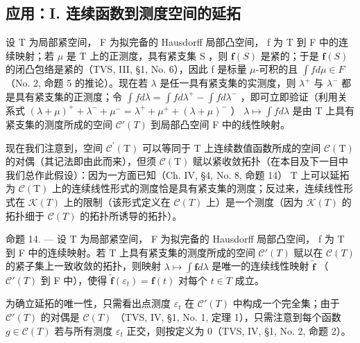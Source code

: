\subsection{应用：I. 连续函数到测度空间的延拓}

设 T 为局部紧空间， F 为拟完备的 Hausdorff 局部凸空间， f 为 T 到 F 中的连续映射；若 \(\mu\) 是 T 上的正测度，具有紧支集 S ，则 \(\mathbf{f}(S)\) 是紧的；于是 \(\mathbf{f}(S)\) 的闭凸包络是紧的（TVS, III, §1, No. 6），因此 f 是标量 \(\mu\)-可积的且 \(\int f d\mu \in F\) （No. 2, 命题 5 的推论）。现在若 \(\lambda\) 是任一具有紧支集的实测度，则 \(\lambda^{+}\) 与 \(\lambda^{-}\) 都是具有紧支集的正测度；令 \(\int f d\lambda = \int f d\lambda^{+} - \int f d\lambda^{-}\) ，即可立即验证（利用关系式 \((\lambda + \mu)^{+} + \lambda^{-} + \mu^{-} = \lambda^{+} + \mu^{+} + (\lambda + \mu)^{-}\) ） \(\lambda \mapsto \int f d\lambda\) 是由 T 上具有紧支集的测度所成的空间 \(\mathcal{C}'(T)\) 到局部凸空间 F 中的线性映射。

现在我们注意到，空间 \(\mathcal{C}^{\prime}(\mathrm{T})\) 可以等同于 T 上连续数值函数所成的空间 \(\mathcal{C}(\mathrm{T})\) 的对偶（其记法即由此而来），但须 \(\mathcal{C}(\mathrm{T})\) 赋以紧收敛拓扑（在本目及下一目中我们总作此假设）：因为一方面已知（Ch. IV, §4, No. 8, 命题 14） T 上可以延拓为 \(\mathcal{C}(\mathrm{T})\) 上的连续线性形式的测度恰是具有紧支集的测度；反过来，连续线性形式在 \(\mathcal{K}(T)\) 上的限制（该形式定义在 \(\mathcal{C}(T)\) 上）是一个测度（因为 \(\mathcal{K}(T)\) 的拓扑细于 \(\mathcal{C}(T)\) 的拓扑所诱导的拓扑）。

命题 14. --- 设 T 为局部紧空间， F 为拟完备的 Hausdorff 局部凸空间， f 为 T 到 F 中的连续映射。若 T 上具有紧支集的测度所成的空间 \(\mathcal{C}'(T)\) 赋以在 \(\mathcal{C}(T)\) 的紧子集上一致收敛的拓扑，则映射 \(\lambda \mapsto \int \mathbf{f} d\lambda\) 是唯一的连续线性映射 \(\widetilde{\mathbf{f}}\) （ \(\mathcal{C}'(T)\) 到 F 中），使得 \(\widetilde{\mathbf{f}}(\varepsilon_t) = \mathbf{f}(t)\) 对每个 \(t \in T\) 成立。

为确立延拓的唯一性，只需看出点测度 \(\varepsilon_{t}\) 在 \(\mathcal{C}'(T)\) 中构成一个完全集；由于 \(\mathcal{C}'(T)\) 的对偶是 \(\mathcal{C}(T)\) （TVS, IV, §1, No. 1, 定理 1），只需注意到每个函数 \(g \in \mathcal{C}(T)\) 若与所有测度 \(\varepsilon_{t}\) 正交，则按定义为 0（TVS, IV, §1, No. 2, 命题 2）。

